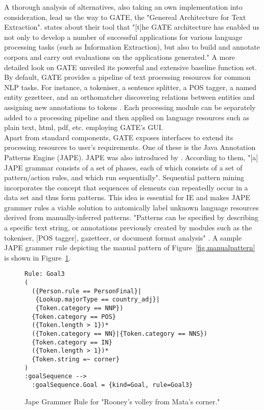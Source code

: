 \documentclass[11pt,titlepage,oneside,openany]{book}
\begin{document}
A thorough analysis of alternatives, also taking an own implementation into consideration, lead us the way to GATE, the "Genereal Architecture for Text Extraction". \citeauthor*{Cunningham2002} \citeyearpar[p.1]{Cunningham2002} states about their tool that "[t]he GATE architecture has enabled us not only to develop a number of successful applications for various  language  processing  tasks  (such as  Information  Extraction),  but  also to  build  and  annotate  corpora  and carry out evaluations on the applications generated." A more detailed look on GATE unveiled its powerful and extensive baseline function set. By default, GATE provides a pipeline of text processing resources for common NLP tasks. For instance, a tokeniser, a sentence splitter, a POS tagger, a named entity gezetteer, and an orthomatcher discovering relations between entities and assigning new annotations to tokens \citep[p.5]{Cunningham2002}. Each processing module can be separately added to a processing pipeline and then applied on language resources such as plain text, html, pdf, etc. employing GATE's GUI.\\ 

Apart from standard components, GATE exposes interfaces to extend its processing resources to user's requirements. One of these is the Java Annotation Patterns Engine (JAPE). JAPE was also introduced by \citeauthor*{Cunningham1999} \citeyearpar{Cunningham1999}. According to them, "[a] JAPE grammar consists of a set of phases, each of which consists of a set of pattern/action rules, and which run sequentially". Sequential pattern mining \citep{Agrawal1995} incorporates the concept that sequences of elements can repeatedly occur in a data set and thus form patterns. This idea is essential for IE and makes JAPE grammer rules a viable solution to automically label unknown language resources derived from manually-inferred patterns. "Patterns can be speciﬁed by describing a speciﬁc text string, or annotations previously created by modules such as the tokeniser, [POS tagger], gazetteer, or document format analysis"  \citep[p.5]{Cunningham2002}. A sample JAPE grammer rule depicting the manual pattern of Figure~\ref{fig.manualpattern} is shown in Figure~\ref{fig.jape}.\\
\begin{figure} [h!]
\centering
\begin{lstlisting}[frame=single]
Rule: Goal3
(
  ({Person.rule == PersonFinal}|
   {Lookup.majorType == country_adj}|
   {Token.category == NNP})
  {Token.category == POS}
  ({Token.length > 1})*
  ({Token.category == NN}|{Token.category == NNS})
  {Token.category == IN} 
  ({Token.length > 1})*
  {Token.string =~ corner}
)
:goalSequence -->
  :goalSequence.Goal = {kind=Goal, rule=Goal3}
\end{lstlisting}
\caption{Jape Grammer Rule for "Rooney's volley from Mata's corner."}
\label{fig.jape}
\end{figure}
\end{document}
